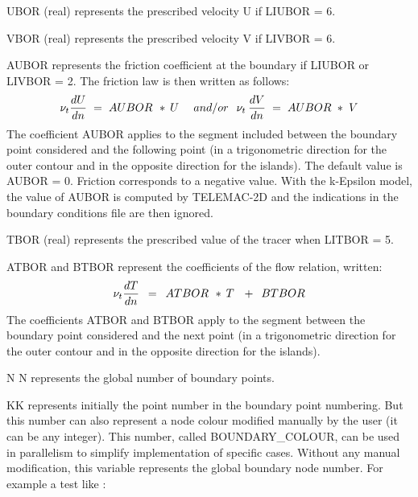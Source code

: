  UBOR (real) represents the prescribed velocity U if LIUBOR = 6.

 VBOR (real) represents the prescribed velocity V if LIVBOR = 6.

 AUBOR  represents the friction coefficient at the boundary if LIUBOR or LIVBOR = 2. The friction law is then written as follows:
\[\nu _{t} \frac{dU}{dn} {\kern 1pt} {\kern 1pt} {\kern 1pt} ={\kern 1pt} {\kern 1pt} {\kern 1pt} AUBOR{\kern 1pt} {\kern 1pt} {\kern 1pt} {\kern 1pt} *{\kern 1pt} {\kern 1pt} U{\kern 1pt} {\kern 1pt} {\kern 1pt} {\kern 1pt} {\kern 1pt} {\kern 1pt} {\kern 1pt} {\kern 1pt} {\kern 1pt} {\kern 1pt} {\kern 1pt} {\kern 1pt} {\kern 1pt} and/or{\kern 1pt} {\kern 1pt} {\kern 1pt} {\kern 1pt} {\kern 1pt} {\kern 1pt} {\kern 1pt} \nu _{t} {\kern 1pt} {\kern 1pt} \frac{dV}{dn} {\kern 1pt} {\kern 1pt} {\kern 1pt} ={\kern 1pt} {\kern 1pt} {\kern 1pt} AUBOR{\kern 1pt} {\kern 1pt} {\kern 1pt} *{\kern 1pt} {\kern 1pt} {\kern 1pt} V\]
The coefficient AUBOR applies to the segment included between the boundary point considered and the following point (in a trigonometric direction for the outer contour and in the opposite direction for the islands). The default value is AUBOR = 0. Friction corresponds to a negative value. With the k-Epsilon model, the value of AUBOR is computed by TELEMAC-2D and the indications in the boundary conditions file are then ignored.

 TBOR (real) represents the prescribed value of the tracer when LITBOR = 5.

 ATBOR and BTBOR represent the coefficients of the flow relation, written:
\[\nu _{t} \frac{dT}{dn} {\kern 1pt} {\kern 1pt} {\kern 1pt} {\kern 1pt} {\kern 1pt} ={\kern 1pt} {\kern 1pt} {\kern 1pt} {\kern 1pt} {\kern 1pt} ATBOR{\kern 1pt} {\kern 1pt} {\kern 1pt} {\kern 1pt} *{\kern 1pt} {\kern 1pt} T{\kern 1pt} {\kern 1pt} {\kern 1pt} {\kern 1pt} {\kern 1pt} {\kern 1pt} {\kern 1pt} +{\kern 1pt} {\kern 1pt} {\kern 1pt} {\kern 1pt} {\kern 1pt} BTBOR\]
The coefficients ATBOR and BTBOR apply to the segment between the boundary point considered and the next point (in a trigonometric direction for the outer contour and in the opposite direction for the islands).

 N N represents the global number of boundary points.

 KK represents initially the point number in the boundary point numbering. But this number can also represent a node colour modified manually by the user (it can be any integer). This number, called BOUNDARY\_COLOUR, can be used in parallelism to simplify implementation of specific cases. Without any manual modification, this variable represents the global boundary node number. For example a test like :

